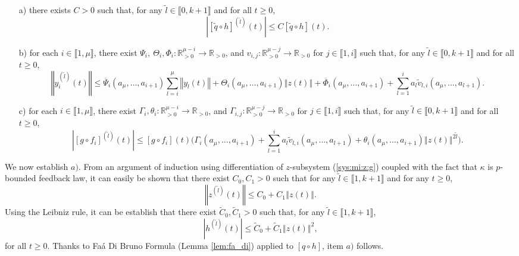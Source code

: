 \documentclass[letterpaper, 10pt]{article}
\newcommand{\rref}[1]{(\ref{#1})}
\newcommand{\norme}[1]{\left\Vert #1\right\Vert}
\newcommand{\abs}[1]{\left| #1 \right|}
\newcommand{\reels}{\mathbb{R}}
\begin{document}
\begin{itemize}
\item[a)] there exists $C >0$ such that, for any $\tilde{l} \in \llbracket 0,k+1 \rrbracket$ and for all $t \geq 0$, 
$$ \abs{[\tilde{q} \circ h]^{(\tilde{l})}(t)} \leq C [\tilde{q} \circ h](t). $$
\item[b)] for each $i \in \llbracket 1 , \mu \rrbracket$, there exist $ \Psi_i, \: \Theta_{i}, \Phi_i :  \reels^{\mu - i}_{>0} \to \reels_{>0} $, and $v_{i,j} :  \reels^{\mu - j}_{>0} \to \reels_{>0}$ for $j \in \llbracket 1 , i \rrbracket$ such that, for any $\tilde{l} \in \llbracket 0,k+1 \rrbracket$ and for all $t \geq 0$, 
$$ \norme{y_i^{(\tilde{l})}(t)  } \leq  \overline{\Psi}_i(a_\mu , \ldots , a_{i+1})  \sum\limits_{l  =i}^{\mu }  \norme{y_l(t)} + \Theta_{i}(a_\mu , \ldots , a_{i+1}) \norme{z(t)} + \overline{\Phi}_i(a_\mu , \ldots , a_{i+1}) + \sum\limits_{l  =1}^{i} a_l  \tilde{v}_{l ,i} (a_\mu , \ldots , a_{l+1}). $$
\item[c)] for each $i \in \llbracket 1 , \mu \rrbracket$, there exist $ \Gamma_i, \theta_i :  \reels^{\mu - i}_{>0} \to \reels_{>0} $, and $\Gamma_{i,j} :  \reels^{\mu - j}_{>0} \to \reels_{>0}$ for $j \in \llbracket 1 , i \rrbracket$ such that, for any $\tilde{l} \in \llbracket 0,k+1 \rrbracket$ and for all $t \geq 0$, 
$$\abs{[g\circ f_i]^{(\tilde{l})}(t)} \leq [g \circ f_i](t) \Big( \Gamma_i(a_\mu , \ldots , a_{i+1}) + \sum\limits_{l  =1}^{i} a_l  \tilde{v}_{l ,i} (a_\mu , \ldots , a_{l+1}) + \theta_i(a_\mu , \ldots , a_{i+1}) \norme{z(t)}^{2 \tilde{l}} \Big). $$
\end{itemize}

We now establish $a)$. From an argument of induction using differentiation of $z$-subsystem \rref{sys:mi:z:g} coupled with the fact that $\kappa$ is $p$-bounded feedback law, it can easily be shown that there exist $C_0, C_1 >0$ such that for any $\tilde{l} \in \llbracket 1, k+1 \rrbracket $ and for any $t \geq 0$,  $$\norme{z^{(\tilde{l})}(t)} \leq C_0 + C_1 \norme{z(t)}.$$ Using the Leibniz rule, it can be establish that there exist $\tilde{C}_0, \tilde{C}_1 >0$ such that, for any $\tilde{l} \in \llbracket 1, k+1 \rrbracket $, $$\abs{h^{(\tilde{l})}(t)} \leq  \tilde{C}_0 + \tilde{C}_1 \norme{z(t)}^2,$$ for all $t \geq 0$. Thanks to Fa\'a Di Bruno Formula (Lemma \ref{lem:fa_di}) applied to $[q\circ h]$, item $a)$ follows.
\end{document}
